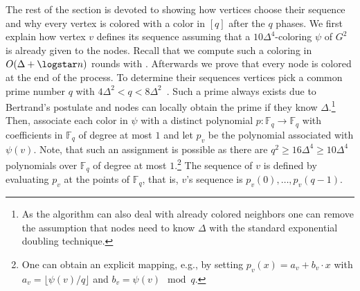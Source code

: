 \medskip 
The rest of the section is devoted to showing how vertices choose their sequence and why every vertex is colored with a color in $[q]$ after the $q$ phases. 
We first explain how vertex $v$ defines its sequence assuming that a $10\Delta^4$-coloring $\psi$ of $G^2$ is already given to the nodes. Recall that we compute such a coloring in $O(\Delta+\logstar n)$ rounds with . Afterwards we prove that every node is colored at the end of the process.
To determine their sequences vertices pick a common prime number $q$ with 
    $4\Delta^2<q<8\Delta^2$~.
Such a prime always exists due to Bertrand's postulate and nodes can locally obtain the prime if they know $\Delta$.\footnote{As the algorithm can also deal with already colored neighbors one can remove the assumption that nodes need to know $\Delta$ with the standard exponential doubling technique. } Then, associate each color in $\psi$ with a distinct polynomial $p: \mathbb{F}_q\rightarrow \mathbb{F}_q$ with coefficients in $ \mathbb{F}_q$ of degree at most $1$ and let $p_v$ be the polynomial associated with $\psi(v)$. Note, that such an assignment is possible as there are $q^2\geq 16\Delta^4\geq 10\Delta^4$ polynomials over $\mathbb{F}_q$ of degree at most $1$.\footnote{One can obtain an explicit mapping, e.g., by setting $p_v(x)=a_v+b_v\cdot x$ with $a_v=\lfloor\psi(v)/q\rfloor$ and $b_v=\psi(v)\mod q$. } 
The sequence of $v$ is defined by evaluating $p_v$ at the points of $\mathbb{F}_q$, that is, $v$'s sequence is $p_v(0),\ldots, p_v(q-1)$.
\medskip 

